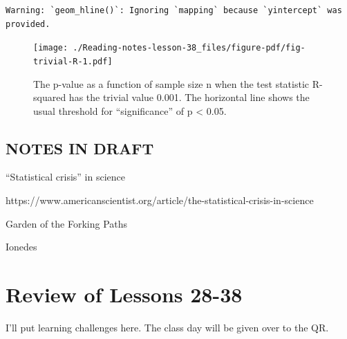 \documentclass[
  letterpaper,
  DIV=11,
  numbers=noendperiod,
  oneside]{scrreprt}
\begin{document}
\begin{verbatim}
Warning: `geom_hline()`: Ignoring `mapping` because `yintercept` was provided.
\end{verbatim}

\begin{figure}

{\centering \texttt{[image: ./Reading-notes-lesson-38\_files/figure-pdf/fig-trivial-R-1.pdf]}

}

\caption{\label{fig-trivial-R}The p-value as a function of sample size n
when the test statistic R-squared has the trivial value 0.001. The
horizontal line shows the usual threshold for ``significance'' of p
\textless{} 0.05.}

\end{figure}

\hypertarget{notes-in-draft}{%
\section{NOTES IN DRAFT}\label{notes-in-draft}}

``Statistical crisis'' in science

https://www.americanscientist.org/article/the-statistical-crisis-in-science

Garden of the Forking Paths

Ionedes

\hypertarget{review-of-lessons-28-38}{%
\chapter{Review of Lessons 28-38}\label{review-of-lessons-28-38}}

\begin{tcolorbox}[enhanced jigsaw, colbacktitle=quarto-callout-warning-color!10!white, breakable, opacitybacktitle=0.6, colback=white, left=2mm, arc=.35mm, colframe=quarto-callout-warning-color-frame, coltitle=black, toprule=.15mm, opacityback=0, leftrule=.75mm, bottomtitle=1mm, toptitle=1mm, titlerule=0mm, title=\textcolor{quarto-callout-warning-color}{\faExclamationTriangle}\hspace{0.5em}{Warning}, rightrule=.15mm, bottomrule=.15mm]

I'll put learning challenges here. The class day will be given over to
the QR.

\end{tcolorbox}
\end{document}
